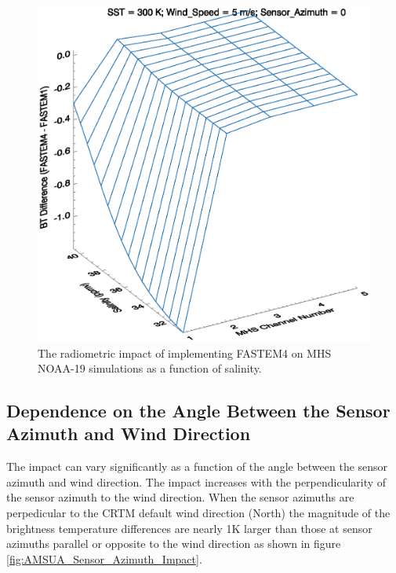 \begin{figure}[htp]
  \centering
  \includegraphics[scale=0.75]{graphics/MHS_Salinity_BT.eps}
  \caption{The radiometric impact of implementing FASTEM4 on MHS NOAA-19 simulations as a function of salinity.}
  \label{fig:MHS_Salinity_Impact}
\end{figure}

\newpage

\subsection{Dependence on the Angle Between the Sensor Azimuth and Wind Direction} 
The impact can vary significantly as a function of the angle between the sensor azimuth and wind direction.  The impact increases with the perpendicularity of the sensor azimuth to the wind direction.  When the sensor azimuths are perpedicular to the CRTM default wind direction (North) the magnitude of the brightness temperature differences are nearly 1K larger than those at sensor azimuths parallel or opposite to the wind direction as shown in figure \ref{fig:AMSUA_Sensor_Azimuth_Impact}.  

